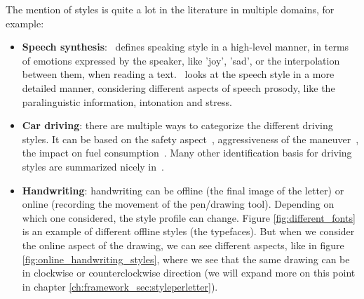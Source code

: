   \par The mention of styles is quite a lot in the literature in multiple domains, for example:
  \begin{itemize}
    \item \textbf{Speech synthesis}:~\citep{tachibana2004hmm} defines speaking style in a high-level manner, in terms of emotions expressed by the speaker, like 'joy', 'sad', or the interpolation between them, when reading a text.~\citep{wang2018style} looks at the speech style in a more detailed manner, considering different aspects of speech prosody, like the paralinguistic information, intonation and stress.
    \item \textbf{Car driving}: there are multiple ways to categorize the different driving styles. It can be based on the safety aspect~\citep{johnson2011driving}, aggressiveness of the maneuver~\citep{dorr2014online,xu2015establishing}, the impact on fuel consumption~\citep{manzoni2010driving,neubauer2013accounting}. Many other identification basis for driving styles are summarized nicely in~\citep{martinez2017driving}.
    \item \textbf{Handwriting}: handwriting can be offline (the final image of the letter) or online (recording the movement of the pen/drawing tool). Depending on which one considered, the style profile can change. Figure \ref{fig:different_fonts} is an example of different offline styles (the typefaces). But when we consider the online aspect of the drawing, we can see different aspects, like in figure \ref{fig:online_handwriting_styles}, where we see that the same drawing can be in clockwise or counterclockwise direction (we will expand more on this point in chapter \ref{ch:framework_sec:styleperletter}).
  \end{itemize}

